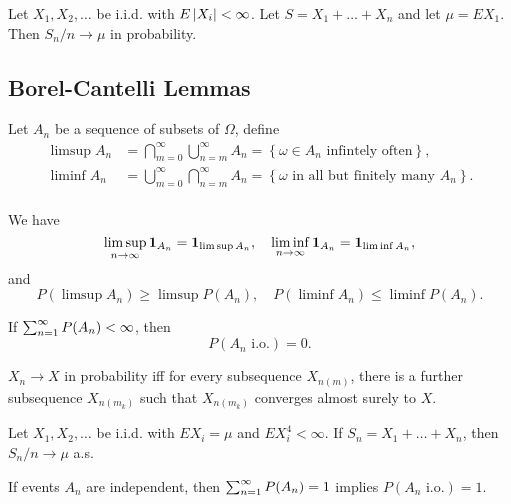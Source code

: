 \documentclass[a4paper]{article}
\begin{document}
\begin{thm}
  Let $X_1, X_2, \dots$ be i.i.d. with $E \left\lvert X_i\right\rvert < \infty$. 
  Let $S = X_1 + \dots + X_n$ and let $\mu = E X_1$. Then 
  $S_n / n \to \mu$ in probability.
\end{thm}

\subsection{Borel-Cantelli Lemmas}

\begin{defi}
  Let $A_n$ be a sequence of subsets of $\Omega$, define 
  \[
  \begin{aligned}
    \limsup A_n 
    &= \bigcap_{m = 0}^\infty \bigcup_{n = m}^\infty A_n 
    = \left\{ \omega \in A_n \text{ infintely often} \right\}, \\
    \liminf A_n 
    &= \bigcup_{m = 0}^\infty \bigcap_{n = m}^\infty A_n 
    = \left\{ \text{$\omega$ in all but finitely many $A_n$} \right\}. \\
  \end{aligned}
  \]
\end{defi}

\begin{prop}
  We have 
  \[
  \limsup_{n \to \infty} \operatorname{\mathbf{1}}_{A_n} = \operatorname{\mathbf{1}}_{\limsup A_n}, \quad 
  \liminf_{n \to \infty} \operatorname{\mathbf{1}}_{A_n} = \operatorname{\mathbf{1}}_{\liminf A_n},
  \]
  and 
  \[
  P(\limsup A_n) \geq \limsup P(A_n), \quad 
  P(\liminf A_n) \leq \liminf P(A_n).
  \]
\end{prop}

\begin{thm}
  If $\sum_{n=1}^\infty P(A_n) < \infty$, then 
  \[
  P(A_n \text{ i.o.}) = 0.
  \]
\end{thm}

\begin{thm}
  $X_n \to X$ in probability iff for every subsequence $X_{n(m)}$, there 
  is a further subsequence $X_{n(m_k)}$ such that $X_{n(m_k)}$ converges 
  almost surely to $X$.
\end{thm}

\begin{thm}
  Let $X_1, X_2, \dots$ be i.i.d. with $E X_i = \mu$ and $E X_i^4 < \infty$.
  If $S_n = X_1 + \dots + X_n$, then $S_n / n \to \mu$ a.s.
\end{thm}

\begin{thm}
  If events $A_n$ are independent, then $\sum_{n=1}^\infty P(A_n) = 1$ implies $
  P(A_n \text{ i.o.}) = 1$.
\end{thm}
\end{document}
